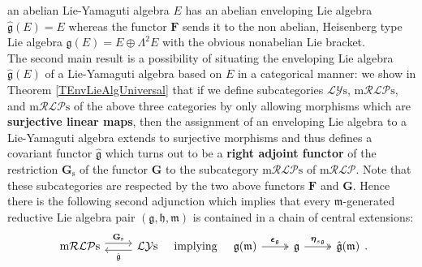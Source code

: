 \documentclass [11pt] {article}
\theoremstyle{definition}
\begin{document}
an abelian Lie-Yamaguti algebra $E$ has an abelian enveloping Lie algebra $\hat{\mathfrak{g}}(E)=E$ whereas the functor $\mathbf{F}$ sends it to the non abelian, Heisenberg type
Lie algebra $\mathfrak{g}(E)=E\oplus \Lambda^2E$ with the obvious 
nonabelian Lie bracket.\\
The second main result is a possibility of situating the enveloping Lie algebra 
$\hat{\mathfrak{g}}(E)$ of a Lie-Yamaguti algebra based on $E$ in a categorical
manner: we show in Theorem \ref{TEnvLieAlgUniversal} that if we define subcategories $\mathcal{LY}\mathrm{s}$, $\mathrm{m}\mathcal{RLP}\mathrm{s}$, 
and $\mathrm{m}\mathcal{RLP}\mathrm{s}$ of  the above three categories by only allowing morphisms which are \textbf{surjective linear maps},
then the assignment of an enveloping Lie algebra to a Lie-Yamaguti algebra extends to surjective morphisms and thus defines a covariant functor $\hat{\mathfrak{g}}$
which turns out to be a \textbf{right adjoint functor} of
the restriction $\mathbf{G}_\mathrm{s}$ of the functor $\mathbf{G}$ to the subcategory $\mathrm{m}\mathcal{RLP}\mathrm{s}$ of $\mathrm{m}\mathcal{RLP}$. Note that these subcategories are respected by the two above functors $\mathbf{F}$
and $\mathbf{G}$. Hence
there is the following second adjunction which implies that every $\mathfrak{m}$-generated reductive Lie algebra pair $(\mathfrak{g},\mathfrak{h,\mathfrak{m}})$ is contained
in a chain of central extensions: 
\[
\begin{tikzcd}
	\mathrm{m}\mathcal{RLP}\mathrm{s}
	\arrow[r, yshift=0.7ex, "\mathbf{G}_\mathrm{s}"]
	&
	\mathcal{LY}\mathrm{s}
	\arrow[l, yshift=-0.7ex, "\hat{\mathfrak{g}}"]	
\end{tikzcd}
~~~\mathrm{implying}~~~
\begin{tikzcd}
	\mathfrak{g}(\mathfrak{m})
	\arrow[r, twoheadrightarrow, "\boldsymbol{\epsilon}_\mathfrak{g}"]
	&   \mathfrak{g}
	\arrow[r, twoheadrightarrow, "\boldsymbol{\eta}_{s\mathfrak{g}}"]
	&\hat{\mathfrak{g}}(\mathfrak{m})
\end{tikzcd}.
\]




\end{document}
